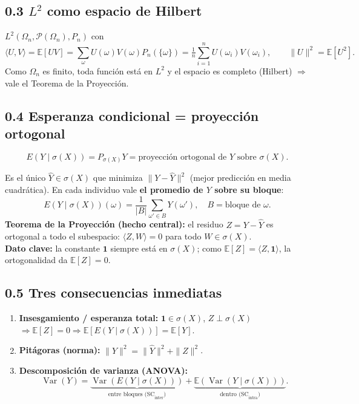 \documentclass[11pt]{article}
\newcommand{\E}{\mathbb{E}}
\newcommand{\Var}{\operatorname{Var}}
\newcommand{\Om}{\Omega_n}
\newcommand{\sg}{\sigma}
\begin{document}
\subsection*{0.3 $L^2$ como espacio de Hilbert}
$L^2(\Om,\mathcal P(\Om),P_n)$ con
\[
\langle U,V\rangle=\E[UV]=\sum_\omega U(\omega)V(\omega)P_n(\{\omega\})=\tfrac1n\sum_{i=1}^n U(\omega_i)V(\omega_i),
\qquad \|U\|^2=\E[U^2].
\]
Como $\Om$ es finito, toda función está en $L^2$ y el espacio es completo (Hilbert) $\Rightarrow$ vale el Teorema de la Proyección.

\subsection*{0.4 Esperanza condicional = proyección ortogonal}
\begin{keybox}
\[ E(Y\mid\sg(X))=P_{\sg(X)}Y=\text{proyección ortogonal de }Y\text{ sobre }\sg(X). \]
\end{keybox}
Es el único $\hat Y\in\sg(X)$ que minimiza $\|Y-\hat Y\|^2$ (mejor predicción en media cuadrática).
En cada individuo vale \textbf{el promedio de $Y$ sobre su bloque}:
\[ E(Y\mid\sg(X))(\omega)=\frac1{|B|}\sum_{\omega'\in B}Y(\omega'),\quad B=\text{bloque de }\omega. \]
\textbf{Teorema de la Proyección (hecho central):} el residuo $Z=Y-\hat Y$ es ortogonal a todo el
subespacio: $\langle Z,W\rangle=0$ para todo $W\in\sg(X)$.\\
\textbf{Dato clave:} la constante $\mathbf 1$ siempre está en $\sg(X)$; como $\E[Z]=\langle Z,\mathbf 1\rangle$,
la ortogonalidad da $\E[Z]=0$.

\subsection*{0.5 Tres consecuencias inmediatas}
\begin{enumerate}[leftmargin=1.6em,itemsep=2pt]
\item \textbf{Insesgamiento / esperanza total:} $\mathbf 1\in\sg(X)$, $Z\perp\sg(X)$
$\Rightarrow\E[Z]=0\Rightarrow \E[E(Y\mid\sg(X))]=\E[Y]$.
\item \textbf{Pitágoras (norma):} $\|Y\|^2=\|\hat Y\|^2+\|Z\|^2$.
\item \textbf{Descomposición de varianza (ANOVA):}
\[ \Var(Y)=\underbrace{\Var(E(Y\mid\sg(X)))}_{\text{entre bloques (SC}_\text{inter})}
+\underbrace{\E(\Var(Y\mid\sg(X)))}_{\text{dentro (SC}_\text{intra})}. \]
\end{enumerate}
\end{document}
